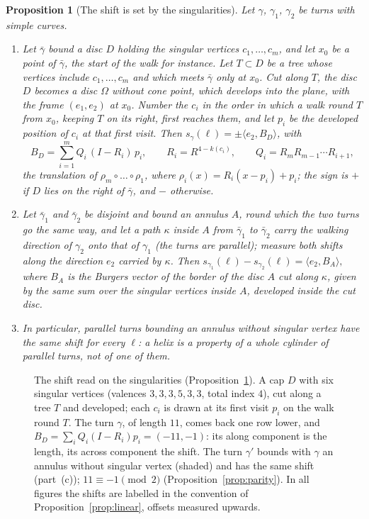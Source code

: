 \documentclass[11pt,a4paper]{article}
\newtheorem{proposition}{Proposition}
\newcommand{\shift}{s}
\begin{document}
\begin{proposition}[The shift is set by the singularities]\label{prop:burgers}
Let $\gamma$, $\gamma_1$, $\gamma_2$ be turns with simple curves.
\begin{enumerate}
\item[(a)] Let $\bar\gamma$ bound a disc $D$ holding the singular vertices
  $c_1, \dots, c_m$, and let $x_0$ be a point of $\bar\gamma$, the start of the
  walk for instance. Let $T \subset D$ be a tree whose vertices include $c_1,
  \dots, c_m$ and which meets $\bar\gamma$ only at $x_0$. Cut along $T$, the
  disc $D$ becomes a disc $\Omega$ without cone point, which develops into the
  plane, with the frame $(e_1, e_2)$ at $x_0$. Number the $c_i$ in the order in
  which a walk round $T$ from $x_0$, keeping $T$ on its right, first reaches
  them, and let $p_i$ be the developed position of $c_i$ at that first visit.
  Then $\shift_\gamma(\ell) = \pm\langle e_2, B_D \rangle$, with
  \[
    B_D = \sum_{i=1}^m Q_i\,(I - R_i)\,p_i ,
    \qquad R_i = R^{4 - k(c_i)},
    \qquad Q_i = R_m R_{m-1} \cdots R_{i+1},
  \]
  the translation of $\rho_m \circ \dots \circ \rho_1$, where $\rho_i(x) =
  R_i(x - p_i) + p_i$; the sign is $+$ if $D$ lies on the right of
  $\bar\gamma$, and $-$ otherwise.
\item[(b)] Let $\bar\gamma_1$ and $\bar\gamma_2$ be disjoint and bound an
  annulus $A$, round which the two turns go the same way, and let a path
  $\kappa$ inside $A$ from $\bar\gamma_1$ to $\bar\gamma_2$ carry the walking
  direction of $\gamma_2$ onto that of $\gamma_1$ (the turns are
  \emph{parallel}); measure both shifts along the direction $e_2$ carried by
  $\kappa$. Then
  \(
    \shift_{\gamma_1}(\ell) - \shift_{\gamma_2}(\ell) = \langle e_2, B_A \rangle,
  \)
  where $B_A$ is the Burgers vector of the border of the disc $A$ cut along
  $\kappa$, given by the same sum over the singular vertices inside $A$,
  developed inside the cut disc.
\item[(c)] In particular, parallel turns bounding an annulus without singular
  vertex have the same shift for every $\ell$: a helix is a property of a
  whole cylinder of parallel turns, not of one of them.
\end{enumerate}
\end{proposition}

\begin{figure}[t]
\centering

\caption{The shift read on the singularities
(Proposition~\ref{prop:burgers}). A cap $D$ with six singular vertices
(valences $3, 3, 3, 5, 3, 3$, total index $4$), cut along a tree $T$ and
developed; each $c_i$ is drawn at its first visit $p_i$ on the walk round $T$.
The turn $\gamma$, of length $11$, comes back one row lower, and $B_D =
\sum_i Q_i (I - R_i) p_i = (-11, -1)$: its along component is the length,
its across component the shift. The turn $\gamma'$ bounds with $\gamma$ an
annulus without singular vertex (shaded) and has the same shift (part~(c));
$11 \equiv -1 \pmod 2$ (Proposition~\ref{prop:parity}). In all figures the shifts
are labelled in the convention of Proposition~\ref{prop:linear}, offsets
measured upwards.}
\label{fig:holonomy}
\end{figure}
\end{document}
